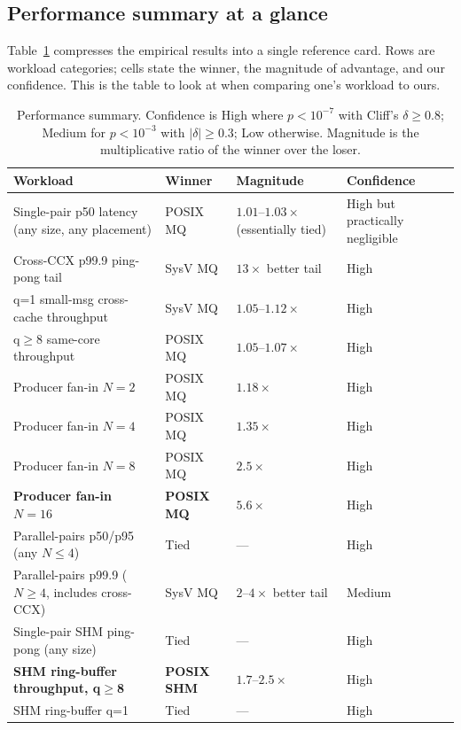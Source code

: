 \documentclass[a4paper,11pt]{article}
\begin{document}
\subsection{Performance summary at a glance}
\label{sec:guidance:perf}

Table~\ref{tab:perf_summary} compresses the empirical results
into a single reference card. Rows are workload categories; cells
state the winner, the magnitude of advantage, and our confidence.
This is the table to look at when comparing one's workload to ours.

\begin{table}[H]
\centering
\caption{Performance summary. Confidence is High where $p<10^{-7}$
with Cliff's $\delta\geq 0.8$; Medium for $p<10^{-3}$ with
$|\delta|\geq 0.3$; Low otherwise. Magnitude is the multiplicative
ratio of the winner over the loser.}
\label{tab:perf_summary}
\footnotesize
\begin{tabular}{p{4.6cm}lp{2.0cm}p{2.0cm}}
\toprule
\textbf{Workload}                                   & \textbf{Winner}     & \textbf{Magnitude} & \textbf{Confidence} \\
\midrule
Single-pair p50 latency (any size, any placement)   & POSIX MQ            & $1.01$--$1.03\times$ (essentially tied) & High but practically negligible \\
Cross-CCX p99.9 ping-pong tail                       & SysV MQ             & $13\times$ better tail   & High \\
q=1 small-msg cross-cache throughput                & SysV MQ             & $1.05$--$1.12\times$     & High \\
q$\geq$8 same-core throughput                        & POSIX MQ            & $1.05$--$1.07\times$     & High \\
Producer fan-in $N=2$                               & POSIX MQ            & $1.18\times$             & High \\
Producer fan-in $N=4$                               & POSIX MQ            & $1.35\times$             & High \\
Producer fan-in $N=8$                               & POSIX MQ            & $2.5\times$              & High \\
\textbf{Producer fan-in $N=16$}                     & \textbf{POSIX MQ}   & $\boldsymbol{5.6\times}$ & High \\
Parallel-pairs p50/p95 (any $N\leq 4$)              & Tied                & ---                      & High \\
Parallel-pairs p99.9 ($N\geq 4$, includes cross-CCX)& SysV MQ             & $2$--$4\times$ better tail & Medium \\
Single-pair SHM ping-pong (any size)                & Tied                & ---                      & High \\
\textbf{SHM ring-buffer throughput, q$\geq$8}       & \textbf{POSIX SHM}  & $\boldsymbol{1.7\text{--}2.5\times}$ & High \\
SHM ring-buffer q=1                                 & Tied                & ---                      & High \\
\bottomrule
\end{tabular}
\end{table}
\end{document}
